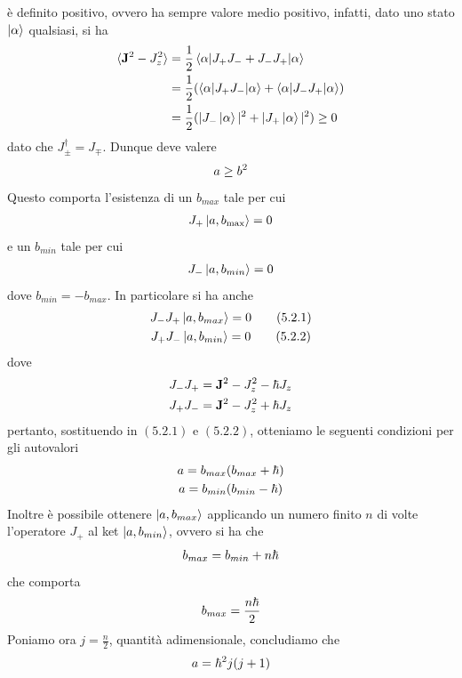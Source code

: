\documentclass{article}
\begin{document}
è definito positivo, ovvero ha sempre valore medio positivo, infatti, dato uno stato $\ket{\alpha}$ qualsiasi, si ha
\begin{align}
    \braket{\mathbf{J}^2 - J_z^2} &= \frac{1}{2}\braket{\alpha|J_+J_- + J_-J_+|\alpha} \notag \\
    &= \frac{1}{2}( \braket{\alpha|J_+J_-|\alpha} + \braket{\alpha|J_-J_+|\alpha}) \notag \\
    &= \frac{1}{2}(|J_-\ket{\alpha}|^2 + |J_+\ket{\alpha}|^2) \geq 0 \notag
\end{align}
dato che $J_\pm^\dagger = J_\mp$. Dunque deve valere
\begin{gather}
    a \geq b^2 \notag
\end{gather}
Questo comporta l'esistenza di un $b_{max}$ tale per cui
\begin{gather}
    J_+\ket{a, b_{\max}} = 0 \notag
\end{gather}
e un $b_{min}$ tale per cui
\begin{gather}
    J_-\ket{a, b_{min}} = 0 \notag
\end{gather}
dove $b_{min} = -b_{max}$. In particolare si ha anche
\begin{gather}
    J_-J_+\ket{a, b_{max}} = 0 \tag{5.2.1} \\
    J_+J_-\ket{a, b_{min}} = 0 \tag{5.2.2}
\end{gather}
dove
\begin{gather}
    J_-J_+ = \mathbf{J}^2 - J_z^2 - \hbar J_z \notag \\
    J_+J_- = \mathbf{J}^2 - J_z^2 + \hbar J_z \notag
\end{gather}
pertanto, sostituendo in $(5.2.1)$ e $(5.2.2)$, otteniamo le seguenti condizioni per gli autovalori
\begin{gather}
    a = b_{max}(b_{max} + \hbar) \notag \\
    a = b_{min}(b_{min} - \hbar) \notag
\end{gather}
Inoltre è possibile ottenere $\ket{a, b_{max}}$ applicando un numero finito $n$ di volte l'operatore $J_+$ al ket $\ket{a, b_{min}}$, ovvero si ha che
\begin{gather}
    b_{max} = b_{min} + n\hbar \notag
\end{gather}
che comporta
\begin{gather}
    b_{max} = \frac{n\hbar}{2} \notag
\end{gather}
Poniamo ora $j = \frac{n}{2}$, quantità adimensionale, concludiamo che
\begin{gather}
    a = \hbar^2j(j+1) \notag
\end{gather}
\end{document}
